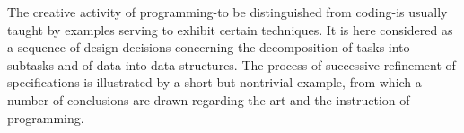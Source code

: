 The creative activity of programming-to be distinguished from coding-is usually
taught by examples serving to exhibit certain techniques.  It is here
considered as a sequence of design decisions concerning the decomposition of
tasks into subtasks and of data into data structures.  The process of
successive refinement of specifications is illustrated by a short but
nontrivial example, from which a number of conclusions are drawn regarding the
art and the instruction of programming.
